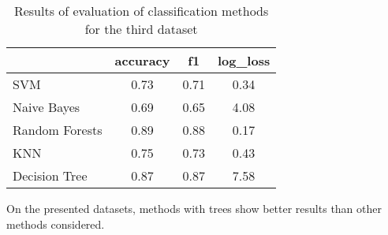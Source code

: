 \begin{table}[ht]
\centering
\caption{Results of evaluation of classification methods for the third dataset}
\begin{tabular}{l|ccc|}
\cline{2-4}
                                     & \multicolumn{1}{c|}{accuracy} & \multicolumn{1}{c|}{f1} & log\_loss \\ \hline
\multicolumn{1}{|l|}{SVM}            & 0.73                          & 0.71                    & 0.34      \\ \hline
\multicolumn{1}{|l|}{Naive Bayes}    & 0.69                          & 0.65                    & 4.08      \\ \hline
\multicolumn{1}{|l|}{Random Forests} & 0.89                          & 0.88                    & 0.17      \\ \hline
\multicolumn{1}{|l|}{KNN}            & 0.75                          & 0.73                    & 0.43      \\ \hline
\multicolumn{1}{|l|}{Decision Tree}  & 0.87                          & 0.87                    & 7.58      \\ \hline
\end{tabular}
\label{tbl:ds_3}
\end{table}

On the presented datasets, methods with trees show better results than other methods considered.
